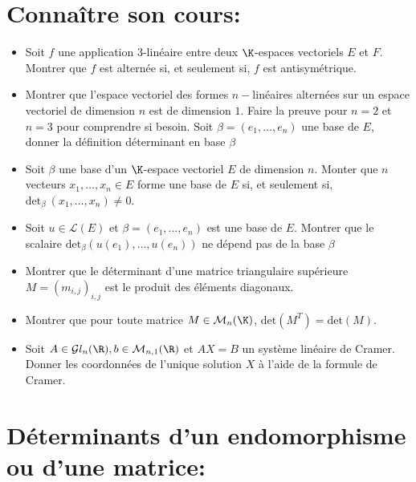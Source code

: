 \documentclass[a4paper,11pt]{article}
\theoremstyle{definition}
\begin{document}
 
 


\noindent{}

\smallskip
\section*{Connaître son cours:}
\begin{itemize}[$\bullet$]
	\item Soit $f$ une application $3$-linéaire entre deux $\K $-espaces vectoriels $E$ et $F $. Montrer que $f$ est alternée si, et
	seulement si, $f$ est antisymétrique.
	\item Montrer que l’espace vectoriel des formes $n-$linéaires alternées sur un espace vectoriel de dimension $n$ est de dimension $1$. Faire la preuve pour $n = 2$ et $n=3$ pour comprendre si besoin. Soit $\beta= (e_1 , \dots , e_n )$ une base de $E $, donner la définition déterminant en base $\beta$
	\item Soit $\beta$ une base d’un $\K $-espace vectoriel $E$ de dimension $n $. Monter  que $n$ vecteurs $x_1 ,\dots , x_n \in E$ forme une base de $E$ si, et seulement si,
	$\text{det}_\beta \ (x_1 , \dots , x_n ) \neq 0$.
	\item Soit  $u \in \mathcal L (E ) $  et  $\beta =	(e_1 , \dots , e_n )$ est une base de $E $. Montrer que le scalaire $\text{det}_\beta (u (e_1 ),\dots, u (e_n ))$ ne dépend pas de
	la base $\beta$
	\item Montrer que le déterminant d’une matrice triangulaire supérieure $M = (m_{i,j})_{i,j}$ est le produit	des éléments diagonaux.
	\item Montrer que pour toute matrice $M \in \mathcal M_n (\K)$, $\text{det}(M^T ) = \text{det}(M ) $.
	\item Soit $A\in \mathcal{G}l_n(\R), b\in \mathcal{M}_{n,1}(\R)$ et $AX = B$ un système linéaire de Cramer. Donner les coordonnées de l’unique solution $X$ à l'aide de la formule de Cramer.  

\end{itemize}
\raggedright

\section*{Déterminants d’un endomorphisme ou d’une matrice:}\hfill\\%
\end{document}
